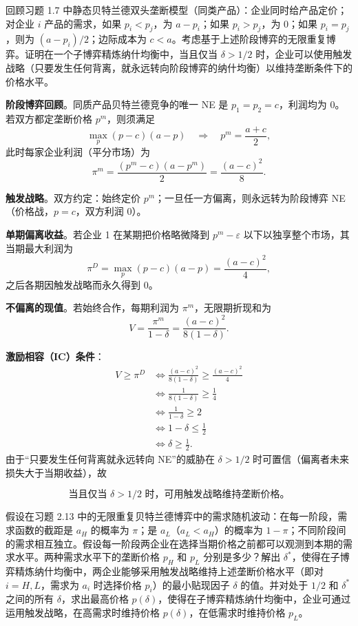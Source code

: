 回顾习题 1.7 中静态贝特兰德双头垄断模型（同类产品）：企业同时给产品定价；对企业 $i$ 产品的需求，如果 $p_i<p_j$，为 $a-p_i$；如果 $p_i>p_j$，为 $0$；如果 $p_i=p_j$，则为 $(a-p_i)/2$；边际成本为 $c<a$。考虑基于上述阶段博弈的无限重复博弈。证明在一个子博弈精炼纳什均衡中，当且仅当 $\delta>1/2$ 时，企业可以使用触发战略（只要发生任何背离，就永远转向阶段博弈的纳什均衡）以维持垄断条件下的价格水平。

\sol
\textbf{阶段博弈回顾}。同质产品贝特兰德竞争的唯一 NE 是 $p_1=p_2=c$，利润均为 $0$。若双方都定垄断价格 $p^m$，则须满足
\[
\max_p (p-c)(a-p)\quad\Longrightarrow\quad p^m=\frac{a+c}{2},
\]\indent
此时每家企业利润（平分市场）为
\[
\pi^m=\frac{(p^m-c)(a-p^m)}{2}=\frac{(a-c)^2}{8}.
\]

\textbf{触发战略}。双方约定：始终定价 $p^m$；一旦任一方偏离，则永远转为阶段博弈 NE（价格战，$p=c$，双方利润 $0$）。

\textbf{单期偏离收益}。若企业 1 在某期把价格略微降到 $p^m-\varepsilon$ 以下以独享整个市场，其当期最大利润为
\[
\pi^D=\max_p (p-c)(a-p)=\frac{(a-c)^2}{4},
\]\indent
之后各期因触发战略而永久得到 $0$。

\textbf{不偏离的现值}。若始终合作，每期利润为 $\pi^m$，无限期折现和为
\[
V=\frac{\pi^m}{1-\delta}=\frac{(a-c)^2}{8(1-\delta)}.
\]

\textbf{激励相容（IC）条件}：
\[
\begin{aligned}
V\ge \pi^D
&\iff \frac{(a-c)^2}{8(1-\delta)}\ge \frac{(a-c)^2}{4}\\
&\iff \frac{1}{8(1-\delta)}\ge \frac14\\
&\iff \frac{1}{1-\delta}\ge 2\\
&\iff 1-\delta\le \frac12\\
&\iff \delta\ge \frac12.
\end{aligned}
\]\indent
由于“只要发生任何背离就永远转向 NE”的威胁在 $\delta>1/2$ 时可置信（偏离者未来损失大于当期收益），故

\[
\boxed{\text{当且仅当 }\delta>1/2\text{ 时，可用触发战略维持垄断价格。}}
\]

假设在习题 2.13 中的无限重复贝特兰德博弈中的需求随机波动：在每一阶段，需求函数的截距是 $a_H$ 的概率为 $\pi$；是 $a_L$（$a_L<a_H$）的概率为 $1-\pi$；不同阶段间的需求相互独立。假设每一阶段两企业在选择当期价格之前都可以观测到本期的需求水平。两种需求水平下的垄断价格 $p_H$ 和 $p_L$ 分别是多少？解出 $\delta^*$，使得在子博弈精炼纳什均衡中，两企业能够采用触发战略维持上述垄断价格水平（即对 $i=H,L$，需求为 $a_i$ 时选择价格 $p_i$）的最小贴现因子 $\delta$ 的值。并对处于 $1/2$ 和 $\delta^*$ 之间的所有 $\delta$，求出最高价格 $p(\delta)$，使得在子博弈精炼纳什均衡中，企业可通过运用触发战略，在高需求时维持价格 $p(\delta)$，在低需求时维持价格 $p_L$。

